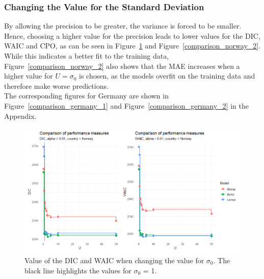 \subsubsection{Changing the Value for the Standard Deviation}
By allowing the precision to be greater, the variance is forced to be smaller. Hence, choosing a higher value for the precision leads to lower values for the DIC, WAIC and CPO, as can be seen in Figure~\ref{comparison_norway_1} and Figure~\ref{comparison_norway_2}. While this indicates a better fit to the training data, Figure~\ref{comparison_norway_2} also shows that the MAE increases when a higher value for $U=\sigma_0$ is chosen, as the models overfit on the training data and therefore make worse predictions. \\
The corresponding figures for Germany are shown in Figure~\ref{comparison_germany_1} and Figure~\ref{comparison_germany_2} in the Appendix.
\begin{figure}[H]
    \centering
    \includegraphics[width = \textwidth]{comparison_1_norway.png}
    \caption{Value of the DIC and WAIC when changing the value for $\sigma_0$. The black line highlights the values for $\sigma_0$ = 1.}
    \label{comparison_norway_1}
\end{figure}
%     
